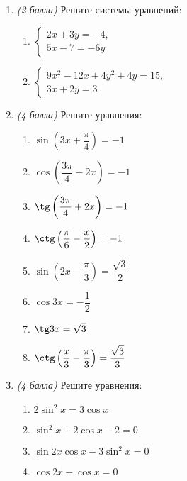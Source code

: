 \documentclass[12pt, a4paper]{article}
\begin{document}
	
	
	\begin{enumerate}
		\item \textit{(2 балла)} Решите системы уравнений:
		\begin{multicols}{2}
			\begin{enumerate}[label=\asbuk*)]
		\item $\left\{
		\begin{array}{l}
			2x+3y=-4,\\
			5x-7=-6y
		\end{array}
		\right.$ 
		\item  $\left\{
		\begin{array}{l}
			9x^2-12x+4y^2+4y=15,\\
			3x+2y=3
		\end{array}
		\right.$ 
	\end{enumerate}
\end{multicols}
		\item \textit{(4 балла)} Решите уравнения:
		\begin{multicols}{2}
			\begin{enumerate}[label=\asbuk*)]
				\item $\sin\left(3x+\dfrac{\pi}{4} \right)=-1 $
				\item $\cos\left( \dfrac{3\pi}{4}-2x\right)=-1 $
				\item $\tg\left( \dfrac{3\pi}{4}+2x\right)=-1 $
				\item $\ctg\left(\dfrac{\pi}{6}-\dfrac{x}{2} \right)=-1 $
				\item $\sin\left( 2x-\dfrac{\pi}{3}\right)=\dfrac{\sqrt{3}}{2} $
				\item $\cos3x=-\dfrac{1}{2}$
				\item $\tg3x=\sqrt{3}$
				\item $\ctg\left(\dfrac{x}{3}-\dfrac{\pi}{3} \right)=\dfrac{\sqrt{3}}{3} $
			\end{enumerate}
		\end{multicols}
		\item \textit{(4 балла)} Решите уравнения:
		\begin{multicols}{2}
			\begin{enumerate}[label=\asbuk*)]
				\item $2\sin^2x=3\cos x$
				\item $\sin^2x+2\cos x-2=0$
				\item $\sin2x\cos x-3\sin^2x=0$
				\item $\cos2x-\cos x=0$
			\end{enumerate}
		\end{multicols}
	\end{enumerate}
	
\end{document}
